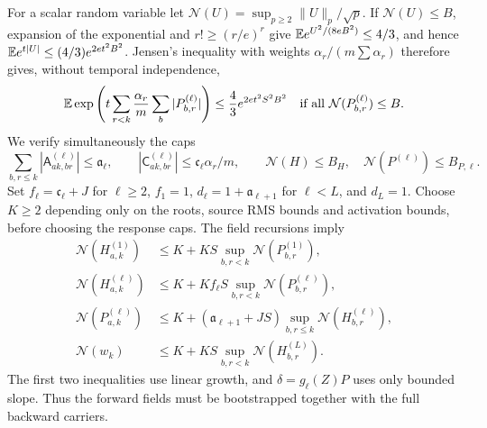 For a scalar random variable let
$\mathcal N(U)=\sup_{p\ge2}\|U\|_p/\sqrt p$.
If $\mathcal N(U)\le B$, expansion of the exponential and
$r!\ge(r/e)^r$ give
$\mathbb{E} e^{U^2/(8eB^2)}\le4/3$, and hence
$\mathbb{E} e^{t|U|}\le(4/3)e^{2et^2B^2}$.
Jensen's inequality with weights $\alpha_r/(m\sum\alpha_r)$ therefore
gives, without temporal independence,
\begin{equation}
 \mathbb{E}\exp\left(t\sum_{r<k}\frac{\alpha_r}{m}
                         \sum_b|P_{b,r}^{(\ell)}|\right)
       \le\frac43 e^{2et^2S^2B^2}
 \quad\text{if all }\mathcal N(P_{b,r}^{(\ell)})\le B.
 \label{eq:at-weighted-exponential}
\end{equation}
We verify simultaneously the caps
\begin{equation}
 \sum_{b,r\le k}|\mathsf A_{ak,br}^{(\ell)}|\le\mathfrak a_\ell,
 \qquad
 |\mathsf C_{ak,br}^{(\ell)}|\le\mathfrak c_\ell\alpha_r/m,
 \qquad \mathcal N(H)\le B_H,\quad
 \mathcal N(P^{(\ell)})\le B_{P,\ell}.
 \label{eq:at-response-caps}
\end{equation}
Set $f_\ell=\mathfrak c_\ell+J$ for $\ell\ge2$, $f_1=1$,
$d_\ell=1+\mathfrak a_{\ell+1}$ for $\ell<L$, and $d_L=1$.
Choose $K\ge2$ depending only on the roots, source RMS bounds and
activation bounds, before choosing the response caps.  The field
recursions imply
\begin{align*}
 \mathcal N(H_{a,k}^{(1)})&\le K+KS\sup_{b,r<k}\mathcal N(P_{b,r}^{(1)}),\\
 \mathcal N(H_{a,k}^{(\ell)})&\le K+Kf_\ell S
                              \sup_{b,r<k}\mathcal N(P_{b,r}^{(\ell)}),\\
 \mathcal N(P_{a,k}^{(\ell)})&\le K+(\mathfrak a_{\ell+1}+JS)
                              \sup_{b,r\le k}\mathcal N(H_{b,r}^{(\ell)}),\\
 \mathcal N(w_k)&\le K+KS\sup_{b,r<k}\mathcal N(H_{b,r}^{(L)}).
\end{align*}
The first two inequalities use linear growth, and $\delta=g_\ell(Z)P$
uses only bounded slope.  Thus the forward fields must be bootstrapped
together with the full backward carriers.

